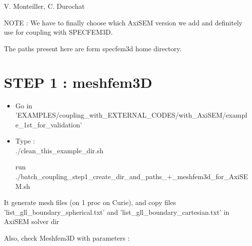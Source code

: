 \documentclass[11pt]{article}
\date{}
\begin{document}
{\huge { }}

\bigskip
\bigskip
\bigskip

 V. Monteiller, C. Durochat

\bigskip
\bigskip

\noindent NOTE : We have to finally choose which AxiSEM version we add and definitely use for coupling with SPECFEM3D.

\medskip

\noindent The paths present here are form specfem3d home directory.

\medskip


\bigskip

\section{STEP 1 : meshfem3D}

\begin{itemize}

\item[\textbullet] Go in 'EXAMPLES/coupling\_with\_EXTERNAL\_CODES/with\_AxiSEM/example\_1st\_for\_validation'

\item[\textbullet] Type : \\

\noindent ./clean\_this\_example\_dir.sh

\smallskip

\noindent run ./batch\_coupling\_step1\_create\_dir\_and\_paths\_+\_meshfem3d\_for\_AxiSEM.sh

\end{itemize}

\noindent It generate mesh files (on 1 proc on Curie), and copy files 'list\_gll\_boundary\_spherical.txt' and 'list\_gll\_boundary\_cartesian.txt' in AxiSEM solver dir

\medskip

\noindent Also, check Meshfem3D with parameters :
\end{document}
